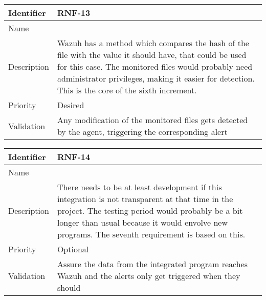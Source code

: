 \begin{table}[H]
	\begin{tabularx}{\textwidth}{|l|X|}
		\hline
		\rowcolor{gray!30}
		Identifier & \textbf{RNF-13} \\ \hline
		Name & \RNFtrece \\ \hline
		Description & Wazuh has a method which compares the hash of the file with the value it should have, that could be used for this case. The monitored files would probably need administrator privileges, making it easier for detection. This is the core of the sixth increment.  \\ \hline
		Priority & Desired \\ \hline
		Validation & Any modification of the monitored files gets detected by the agent, triggering the corresponding alert \\ \hline
	\end{tabularx}
\end{table}
\begin{table}[H]
	\begin{tabularx}{\textwidth}{|l|X|}
		\hline
		\rowcolor{gray!30}
		Identifier & \textbf{RNF-14} \\ \hline
		Name & \RNFcatorce \\ \hline
		Description & There needs to be at least development if this integration is not transparent at that time in the project. The testing period would probably be a bit longer than usual because it would envolve new programs. The seventh requirement is based on this. \\ \hline
		Priority & Optional \\ \hline
		Validation & Assure the data from the integrated program reaches Wazuh and the alerts only get triggered when they should \\ \hline
	\end{tabularx}
\end{table}
